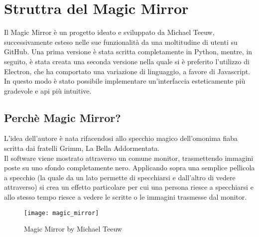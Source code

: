 \chapter{Struttra del Magic Mirror}

Il Magic Mirror \`e un progetto ideato e sviluppato da Michael Teeuw, successivamente esteso nelle sue funzionalit\`a da una moltitudine di utenti su GitHub.
Una prima versione \`e stata scritta completamente in Python, mentre, in seguito, \`e stata creata una seconda versione nella quale si \`e preferito l'utilizzo di Electron,
che ha comportato una variazione di linguaggio, a favore di Javascript. In questo modo \`e stato possibile implementare un'interfaccia esteticamente pi\`u gradevole
e api pi\`u intuitive.
\\[2\baselineskip]

\section{Perch\`e Magic Mirror?}
L'idea dell'autore \`e nata rifacendosi allo specchio magico dell'omonima fiaba
scritta dai fratelli Grimm, La Bella Addormentata.\\
Il software viene mostrato attraverso un
comune monitor, trasmettendo immagini poste su uno sfondo completamente nero. Applicando sopra
una semplice pellicola a specchio (la quale da un lato permette di specchiarsi e dall'altro di vedere
attraverso) si crea un effetto particolare per cui una persona riesce a specchiarsi
e allo stesso tempo riesce a vedere le scritte o le immagini trasmesse dal monitor.
\\[2\baselineskip]
\begin{figure}[H]
    \texttt{[image: magic\_mirror]}
    \caption{Magic Mirror by Michael Teeuw}
\end{figure}

